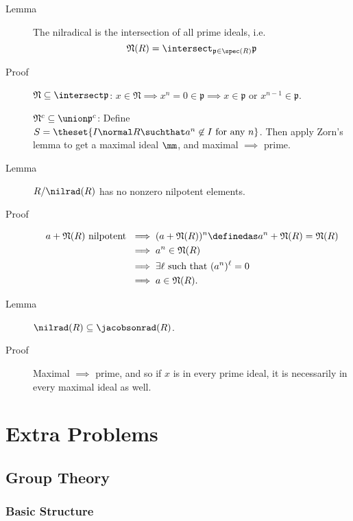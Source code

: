 \begin{description}
\item[Lemma]
The nilradical is the intersection of all prime ideals, i.e. \[
  \mathfrak{N}(R) = \intersect_{\mathfrak{p} \in \spec(R)} \mathfrak{p}
  \]
\item[Proof]
\(\mathfrak{N} \subseteq \intersect \mathfrak{p}\):
\(x \in \mathfrak{N} \implies x^n = 0 \in \mathfrak p \implies x\in \mathfrak{p} \text{ or } x^{n-1}\in\mathfrak p\).

\(\mathfrak{N}^c \subseteq \union \mathfrak{p}^c\): Define
\(S = \theset{I\normal R \suchthat a^n\not\in I \text{ for any } n}\).
Then apply Zorn's lemma to get a maximal ideal \(\mm\), and maximal
\(\implies\) prime.
\item[Lemma]
\(R/\mathfrak \nilrad(R)\) has no nonzero nilpotent elements.
\item[Proof]
\hfill

\begin{align*}
a + \mathfrak N(R)\text{ nilpotent } &\implies (a+ \mathfrak N(R))^n \definedas a^n + \mathfrak N(R)= \mathfrak N(R) \\
&\implies a^n \in \mathfrak N(R) \\
&\implies \exists \ell \text{ such that } (a^n)^\ell = 0 \\
&\implies a\in \mathfrak N(R)
.\end{align*}
\item[Lemma]
\(\mathfrak \nilrad (R) \subseteq \jacobsonrad(R)\).
\item[Proof]
Maximal \(\implies\) prime, and so if \(x\) is in every prime ideal, it
is necessarily in every maximal ideal as well.
\end{description}

\hypertarget{extra-problems}{%
\section{Extra Problems}\label{extra-problems}}

\hypertarget{group-theory-2}{%
\subsection{Group Theory}\label{group-theory-2}}

\hypertarget{basic-structure}{%
\subsubsection{Basic Structure}\label{basic-structure}}

